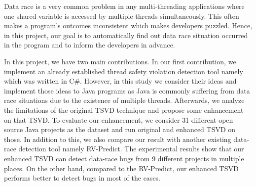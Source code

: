 Data race is a very common problem in any multi-threading applications where
one shared variable is accessed by multiple threads simultaneously. This often
makes a program's outcomes inconsistent which makes developers puzzled. Hence, in this
project, our goal is to automatically find out data race situation occurred
in the program and to inform the developers in advance.

In this project, we have two main contributions. In our first contribution, we implement an already established thread safety violation detection tool
namely \Toolname{} which was written in C\#. However, in this study we consider their ideas and implement those ideas to Java programs as Java is commonly suffering from data
race situations due to the existence of multiple threads. Afterwards, we analyze the limitations of the original TSVD technique and propose some enhancement on that TSVD. To evaluate our enhancement, we consider 31 different open source Java projects as the dataset and run original and enhanced TSVD on those. In addition to this, we also compare our result with another existing data-race detection tool namely RV-Predict. The experimental results show that our enhanced TSVD can detect data-race bugs from 9 different projects in multiple places. On the other hand, compared to the RV-Predict, our enhanced TSVD performs better to detect bugs in most of the cases.



